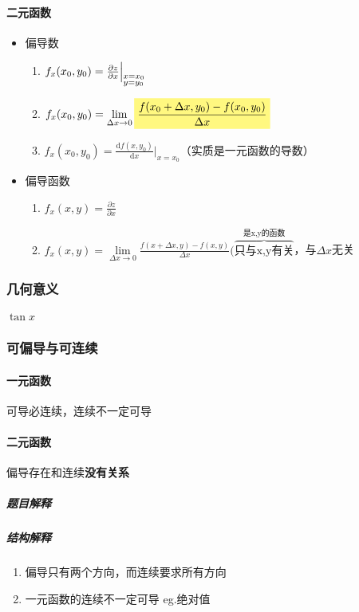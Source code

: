 \documentclass[UTF8,a4paper,12pt,scheme=chinese]{ctexbook}
\newcommand{\ud}{\mathrm{d}}
\newcommand{\hla}[1]{%
	\colorbox{yellow!50}{$\displaystyle#1$}}
\theoremstyle{plain}
\begin{document}
	\paragraph{二元函数}
	\begin{itemize}
		\item 偏导数
		\begin{enumerate}
			\item $f_x(x_0,y_0)=\frac{\partial z}{\partial x}\Big|_{
				\begin{subarray}{l}
				x=x_0\\
				y=y_0
				\end{subarray}}$
			\item $f_x(x_0,y_0)=\lim\limits_{\Delta x \rightarrow 0}
			\hla{\frac{f(x_0+\Delta x,y_0)-f(x_0,y_0)}{\Delta x}}$
			\item $f_x(x_0,y_0)=\frac{\ud f(x,y_0)}{\ud x}\Big|_{x=x_0}$（实质是一元函数的导数）
		\end{enumerate}
		\item 偏导函数
		\begin{enumerate}
			\item $f_x(x,y)=\frac{\partial z}{\partial x}$
			\item $f_x(x,y)=\lim\limits_{\Delta x \rightarrow 0}
			\frac{f(x+\Delta x,y)-f(x,y)}{\Delta x}(\overbrace{{\mbox{只与x,y有关}}}^{\mbox{是x,y的函数}}$，与$\Delta x$无关
		\end{enumerate}
	\end{itemize}
	\subsubsection{几何意义}
	\paragraph{$\tan x$}
	\subsubsection{可偏导与可连续}
	\paragraph{一元函数}
	可导必连续，连续不一定可导
	\paragraph{二元函数}
	偏导存在和连续\textbf{没有关系}
	\subparagraph{题目解释}
	\subparagraph{结构解释}
	\begin{enumerate}
		\item 偏导只有两个方向，而连续要求所有方向
		\item 一元函数的连续不一定可导
		\subitem eg.绝对值
	\end{enumerate}
\end{document}
